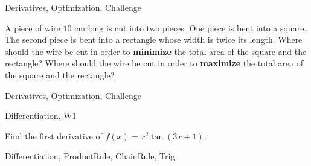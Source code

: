 
\begin{tagblock}{Derivatives, Optimization, Challenge}

\begin{question}

A piece of wire $10$ cm long is cut into two pieces. One piece is bent into a square. The second piece is bent into a rectangle whose width is twice its length. Where should the wire be cut in order to \textbf{minimize} the total area of the square and the rectangle? Where should the wire be cut in order to \textbf{maximize} the total area of the square and the rectangle?


	
\begin{tags}
	   Derivatives, Optimization, Challenge

\end{tags}
	
\begin{diary}
\end{diary}
	
\begin{solution}
	   
\end{solution}
	
\end{question}

\end{tagblock}
\begin{tagblock}{Differentiation, W1}
\begin{question}
	Find the first derivative of $f(x)=x^2\tan(3x+1)$.
	
	
\begin{tags}
	    Differentiation, ProductRule, ChainRule, Trig
\end{tags}
	
\begin{diary}
\end{diary}
	
\begin{solution}
	   
\end{solution}
	
\end{question}

\end{tagblock}

